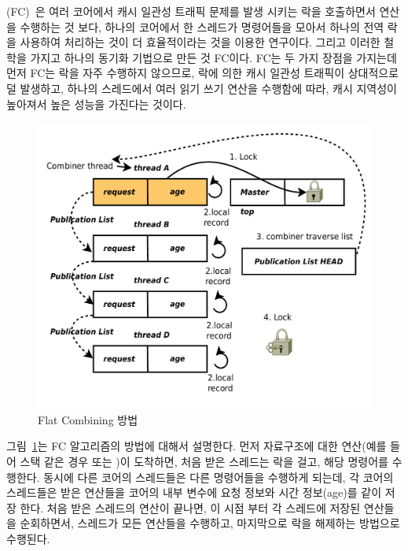 (FC)~\cite{Hendler2010FC}은 여러 코어에서 캐시 일관성 트래픽 문제를 발생 시키는 
락을 호출하면서 연산을 수행하는 것 보다, 하나의 코어에서 한 스레드가 명령어들을 
모아서 하나의 전역 락을 사용하여 처리하는 것이 더 효율적이라는 것을 이용한 연구이다.
그리고 이러한 철학을 가지고 하나의 동기화 기법으로 만든 것 FC이다.
FC는 두 가지 장점을 가지는데 먼저 FC는 락을 자주 수행하지 않으므로, 락에 의한 
캐시 일관성 트래픽이 상대적으로 덜 발생하고,
하나의 스레드에서 여러 읽기 쓰기 연산을 수행함에 따라, 캐시 지역성이 높아져서 
높은 성능을 가진다는 것이다. 

\begin{figure}[h!]
    \centering
    \includegraphics[width=1\textwidth]{fig/FC/FC}
    \caption{Flat Combining 방법}
  \label{fig:FC}
\end{figure}

그림~\ref{fig:FC}는 FC 알고리즘의 방법에 대해서 설명한다. 
먼저 자료구조에 대한 연산(예를 들어 스택 같은 경우  또는 )이 도착하면, 
처음 받은 스레드는 락을 걸고, 해당 명령어를 수행한다. 
동시에 다른 코어의 스레드들은 다른 명령어들을 수행하게 되는데, 각 코어의 스레드들은 
받은 연산들을 코어의 내부 변수에 요청 정보와 시간 정보(age)를 같이 저장 한다.
처음 받은 스레드의 연산이 끝나면, 이 시점 부터 각 스레드에 저장된 연산들을 순회하면서, 
 스레드가 모든 연산들을 수행하고, 마지막으로 락을 해제하는 방법으로 수행된다. 

